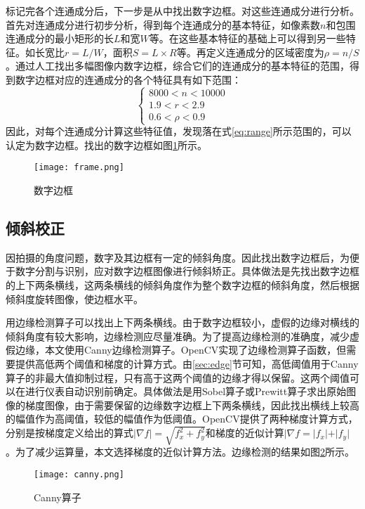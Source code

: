 标记完各个连通成分后，下一步是从中找出数字边框。对这些连通成分进行分析。首先对连通成分进行初步分析，得到每个连通成分的基本特征，如像素数$n$和包围连通成分的最小矩形的长$L$和宽$W$等。在这些基本特征的基础上可以得到另一些特征。如长宽比$r=L/W$，面积$S=L\times R$等。再定义连通成分的区域密度为$\rho=n/S$。通过人工找出多幅图像内数字边框，综合它们的连通成分的基本特征的范围，得到数字边框对应的连通成分的各个特征具有如下范围：
\begin{equation}
  \label{eq:range}
  \begin{cases}
    8000  <  n  <  10000 \\
1.9  <  r  <  2.9 \\
0.6  <  \rho  < 0.9 
  \end{cases}
\end{equation}
因此，对每个连通成分计算这些特征值，发现落在式\eqref{eq:range}所示范围的，可以认定为数字边框。找出的数字边框如图\ref{eq:frame}所示。
\begin{figure}[h]
  \centering
  \texttt{[image: frame.png]}
  \caption{数字边框}
  \label{eq:frame}
\end{figure}

\subsection{倾斜校正}

因拍摄的角度问题，数字及其边框有一定的倾斜角度。因此找出数字边框后，为便于数字分割与识别，应对数字边框图像进行倾斜矫正。具体做法是先找出数字边框的上下两条横线，这两条横线的倾斜角度作为整个数字边框的倾斜角度，然后根据倾斜度旋转图像，使边框水平。

用边缘检测算子可以找出上下两条横线。由于数字边框较小，虚假的边缘对横线的倾斜角度有较大影响，边缘检测应尽量准确。为了提高边缘检测的准确度，减少虚假边缘，本文使用Canny边缘检测算子。OpenCV实现了边缘检测算子函数，但需要提供高低两个阈值和梯度的计算方式。由\ref{sec:edge}节可知，高低阈值用于Canny算子的非最大值抑制过程，只有高于这两个阈值的边缘才得以保留。这两个阈值可以在进行仪表自动识别前确定。具体做法是用Sobel算子或Prewitt算子求出原始图像的梯度图像，由于需要保留的边缘数字边框上下两条横线，因此找出横线上较高的幅值作为高阈值，较低的幅值作为低阈值。OpenCV提供了两种梯度计算方式，分别是按梯度定义给出的算式$|\nabla f|=\sqrt{f_x^2+f_y^2}$和梯度的近似计算$|\nabla f=|f_x|+|f_y|$。为了减少运算量，本文选择梯度的近似计算方法。边缘检测的结果如图\ref{fig:canny}所示。
\begin{figure}[h]
  \centering
  \texttt{[image: canny.png]}
  \caption{Canny算子}
  \label{fig:canny}
\end{figure}

